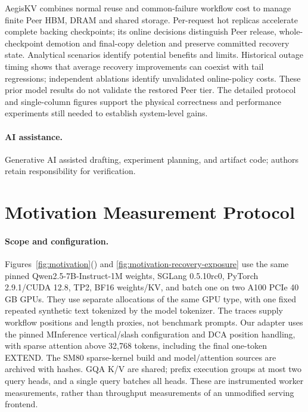 \documentclass[sigplan,10pt,anonymous,nonacm]{acmart}
\begin{document}
AegisKV combines normal reuse and common-failure workflow cost to manage
finite Peer HBM, DRAM and shared storage. Per-request hot replicas
accelerate complete backing checkpoints; its online decisions distinguish
Peer release, whole-checkpoint demotion and final-copy deletion and preserve committed recovery state. Analytical
scenarios identify potential benefits and limits. Historical outage timing
shows that average recovery improvements can coexist with tail regressions;
independent ablations identify unvalidated online-policy costs. These
prior model results do not validate the restored Peer tier. The detailed
protocol and single-column figures support the physical correctness and performance
experiments still needed to establish system-level gains.

\paragraph{AI assistance.}
Generative AI assisted drafting, experiment planning, and artifact code;
authors retain responsibility for verification.




\appendix
\section{Motivation Measurement Protocol}
\label{sec:motivation-protocol}

\paragraph{Scope and configuration.}
Figures~\ref{fig:motivation}() and
\ref{fig:motivation-recovery-exposure} use the same pinned
Qwen2.5-7B-Instruct-1M weights, SGLang 0.5.10rc0, PyTorch 2.9.1/CUDA 12.8,
TP2, BF16 weights/KV, and batch one on two A100 PCIe 40\,GB GPUs.
They use separate allocations of the same GPU type, with one fixed
repeated synthetic text tokenized by the model tokenizer. The traces
supply workflow positions and length proxies, not benchmark prompts.
Our adapter uses the pinned MInference vertical/slash configuration and
DCA position handling, with sparse attention above 32,768 tokens,
including the final one-token EXTEND. The SM80 sparse-kernel build and
model/attention sources are archived with hashes. GQA K/V are shared;
prefix execution groups at most two query heads, and a single query
batches all heads. These are instrumented worker measurements, rather
than throughput measurements of an unmodified serving frontend.
\end{document}
